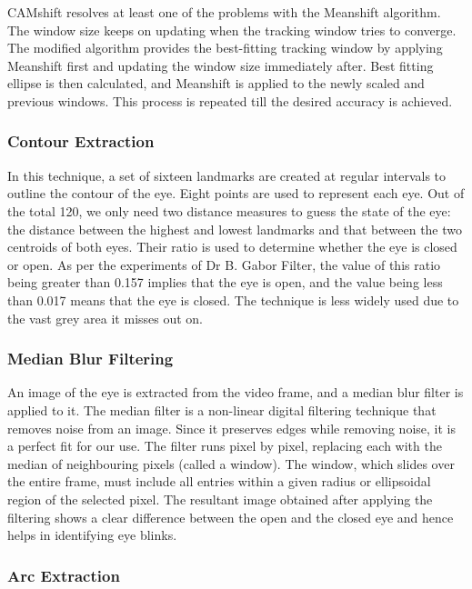 \documentclass[conference]{IEEEtran}
\begin{document}
CAMshift resolves at least one of the problems with the Meanshift algorithm. The window size keeps on updating when the tracking window tries to converge. The modified algorithm provides the best-fitting tracking window by applying Meanshift first and updating the window size immediately after. Best fitting ellipse is then calculated, and Meanshift is applied to the newly scaled and previous windows. This process is repeated till the desired accuracy is achieved.


\subsubsection{Contour Extraction}

In this technique, a set of sixteen landmarks are created at regular intervals to outline the contour of the eye. Eight points are used to represent each eye. Out of the total 120, we only need two distance measures to guess the state of the eye: the distance between the highest and lowest landmarks and that between the two centroids of both eyes. Their ratio is used to determine whether the eye is closed or open. As per the experiments of Dr B. Gabor Filter,  the value of this ratio being greater than 0.157 implies that the eye is open, and the value being less than 0.017 means that the eye is closed. The technique is less widely used due to the vast grey area it misses out on.

\subsubsection{Median Blur Filtering}

An image of the eye is extracted from the video frame, and a median blur filter is applied to it. The median filter is a non-linear digital filtering technique that removes noise from an image. Since it preserves edges while removing noise, it is a perfect fit for our use. The filter runs pixel by pixel, replacing each with the median of neighbouring pixels (called a window). The window, which slides over the entire frame, must include all entries within a given radius or ellipsoidal region of the selected pixel.
The resultant image obtained after applying the filtering shows a clear difference between the open and the closed eye and hence helps in identifying eye blinks.


\subsubsection{Arc Extraction}
\end{document}

